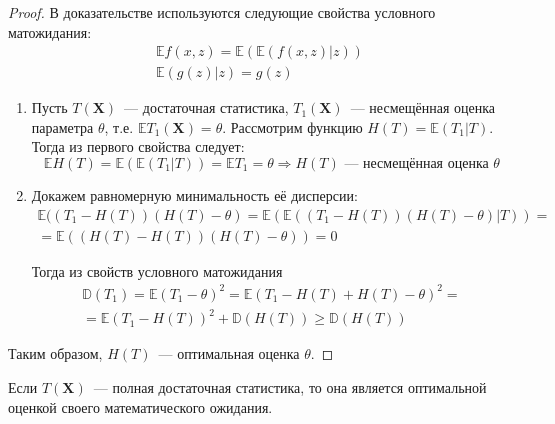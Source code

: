 \begin{proof}
В доказательстве используются следующие свойства условного матожидания: 
\begin{gather*}
    \mathbb{E} f(x, z)=\mathbb{E}(\mathbb{E}(f(x, z) | z)) \\
    \mathbb{E}(g(z) | z)=g(z)
\end{gather*}

\begin{enumerate}
    \item Пусть $T(\mathbf{X})$~--- достаточная статистика, $T_1(\mathbf{X})$~--- несмещённая оценка параметра $\theta$, т.е. $\mathbb{E} T_{1}(\mathbf{X})=\theta$. Рассмотрим функцию $H(T)=\mathbb{E}\left(T_{1} | T\right)$. Тогда из первого свойства следует:
    \begin{equation*}
        \mathbb{E} H(T)=\mathbb{E}\left(\mathbb{E}\left(T_{1} |     T\right)\right)=\mathbb{E} T_{1}=\theta \Rightarrow H(T)     \text{~--- несмещённая оценка~} \theta
    \end{equation*}

    \item Докажем равномерную минимальность её дисперсии:
    \begin{multline*}
        \mathbb{E}((T_{1}-H(T))(H(T)-\theta)
        = \mathbb{E}(\mathbb{E}((T_{1}-H(T))(H(T)-\theta) | T)) 
        = \\
        = \mathbb{E}((H(T)-H(T))(H(T)-\theta))
        = 0
    \end{multline*}

    Тогда из свойств условного матожидания
    \begin{multline*}
        \mathbb{D}\left(T_{1}\right) 
        = \mathbb{E}\left(T_{1}-\theta\right)^{2}=\mathbb{E}\left(T_{1}-H(T)+H(T)-\theta\right)^{2} =\\
        = \mathbb{E}\left(T_{1}-H(T)\right)^{2}+\mathbb{D}(H(T)) \geqslant \mathbb{D}(H(T))
    \end{multline*}
\end{enumerate}
Таким образом, $H(T)$~--- оптимальная оценка $\theta$.

\end{proof}

\begin{namedthm}
Если $T(\mathbf{X})$~--- полная достаточная статистика, то она является оптимальной оценкой своего математического ожидания.
\end{namedthm}

